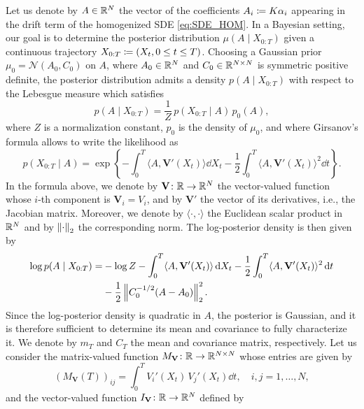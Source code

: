 \documentclass[10pt]{article}
\begin{document}
Let us denote by $A \in \mathbb{R}^N$ the vector of the coefficients $A_i \coloneqq K \alpha_i$ appearing in the drift term of the homogenized SDE \eqref{eq:SDE_HOM}. In a Bayesian setting, our goal is to determine the posterior distribution $\mu(A \mid X_{0:T})$ given a continuous trajectory $X_{0:T} \coloneqq (X_t, 0 \leq t \leq T)$. Choosing a Gaussian prior $\mu_0 = \mathcal N(A_0, C_0)$ on $A$, where $A_0 \in \mathbb{R}^N$ and $C_0 \in \mathbb{R}^{N\times N}$ is symmetric positive definite, the posterior distribution admits a density $p(A \mid X_{0:T})$ with respect to the Lebesgue measure which satisfies
\begin{equation}
	p(A \mid X_{0:T}) = \frac1Z \, p(X_{0:T} \mid A) \, p_0(A),
\end{equation}
where $Z$ is a normalization constant, $p_0$ is the density of $\mu_0$, and where Girsanov's formula allows to write the likelihood as
\begin{equation}
	p(X_{0:T} \mid A) = \exp\left\{-\int_0^T \langle A, \mathbf V'(X_t)\rangle \dd X_t - \frac12 \int_0^T \langle A, \mathbf V'(X_t) \rangle^2 \dd t \right\}.
\end{equation}
In the formula above, we denote by $\mathbf V \colon \mathbb{R} \to \mathbb{R}^N$ the vector-valued function whose $i$-th component is $\mathbf V_i = V_i$, and by $\mathbf V'$ the vector of its derivatives, i.e., the Jacobian matrix. Moreover, we denote by $\langle \cdot, \cdot \rangle$ the Euclidean scalar product in $\mathbb{R}^N$ and by $\left\|\cdot\right\|_2$ the corresponding norm. The log-posterior density is then given by
\begin{equation}
\begin{aligned}
	\log p(A \mid X_{0:T}) = &-\log Z -\int_0^T \langle A, \mathbf V'(X_t)\rangle \,\mathrm{d} X_t - \frac12 \int_0^T \langle A, \mathbf V'(X_t) \rangle^2 \,\mathrm{d} t \\
	&- \frac12 \left\|C_0^{-1/2}(A - A_0)\right\|_2^2.
\end{aligned}
\end{equation}
Since the log-posterior density is quadratic in $A$, the posterior is Gaussian, and it is therefore sufficient to determine its mean and covariance to fully characterize it. We denote by $m_T$ and $C_T$ the mean and covariance matrix, respectively. Let us consider the matrix-valued function $M_{\mathbf V} \colon \mathbb{R} \to \mathbb{R}^{N\times N}$ whose entries are given by
\begin{equation}
	(M_{\mathbf V}(T))_{ij} = \int_0^T V_i'(X_t) \, V_j'(X_t) \dd t, \quad i, j = 1, \ldots, N,
\end{equation}
and the vector-valued function $I_{\mathbf V} \colon \mathbb{R} \to \mathbb{R}^N$ defined by
\end{document}
